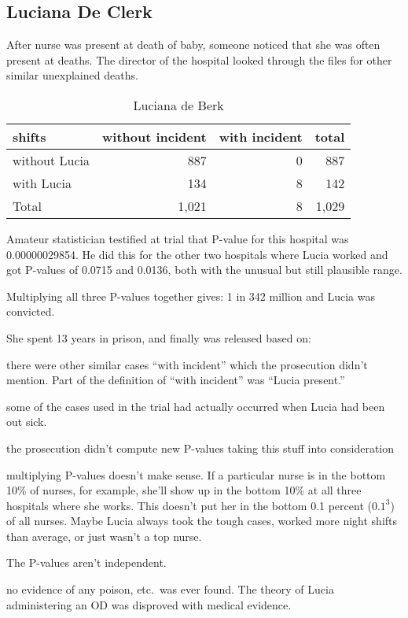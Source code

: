 \documentclass[letterpaper, landscape]{exam}
\begin{document}
  \subsection{Luciana De Clerk}

  After nurse was present at death of baby, someone noticed that she was often
  present at deaths. The director of the hospital looked through the files for
  other similar unexplained deaths. 

  \begin{table}[H]
    \centering
    \begin{tabular}{lrrr}
      \toprule
      shifts        & without incident & with incident & total \\
      \midrule
      without Lucia & 887              & 0             & 887 \\
      with Lucia    & 134              & 8             & 142 \\
      Total         & 1,021            & 8             & 1,029 \\
      \bottomrule
    \end{tabular}
    \caption{Luciana de Berk}\label{tab:ldb1}
  \end{table}

  Amateur statistician testified at trial that P-value for this hospital was
  0.00000029854. He did this for the other two hospitals where Lucia worked and
  got P-values of 0.0715 and 0.0136, both with the unusual but still plausible
  range.

  Multiplying all three P-values together gives: 1 in 342 million and Lucia was
  convicted.

  She spent 13 years in prison, and finally was released based on:
  \begin{itemize*}

    \item there were other similar cases ``with incident'' which the prosecution
      didn't mention. Part of the definition of ``with incident'' was ``Lucia
      present.''

    \item some of the cases used in the trial had actually occurred when Lucia
      had been out sick.

    \item the prosecution didn't compute new P-values taking this stuff into
      consideration

    \item multiplying P-values doesn't make sense. If a particular nurse is in
      the bottom 10\% of nurses, for example, she'll show up in the bottom 10\%
      at all three hospitals where she works. This doesn't put her in the bottom
      0.1 percent ($0.1^3$) of all nurses. Maybe Lucia always took the tough
      cases, worked more night shifts than average, or just wasn't a top nurse.

      The P-values aren't independent.

    \item no evidence of any poison, etc.\ was ever found. The theory of Lucia
      administering an OD was disproved with medical evidence. 
  \end{itemize*}
\end{document}
